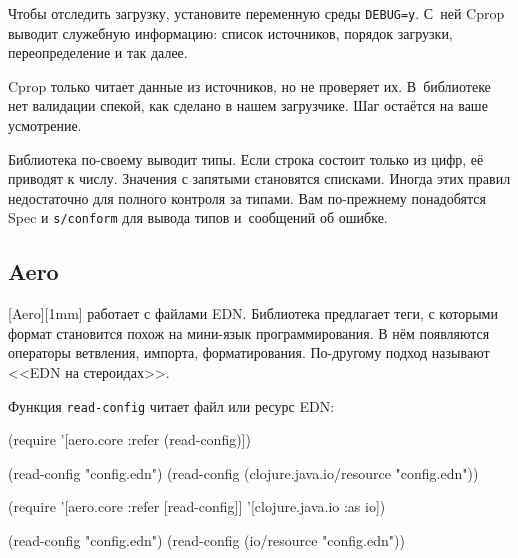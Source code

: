 Чтобы отследить загрузку, установите переменную среды \verb|DEBUG=y|. С~ней
Cprop выводит служебную информацию: список источников, порядок загрузки,
переопределение и так далее.

Cprop только читает данные из источников, но не проверяет их. В~библиотеке нет
валидации спекой, как сделано в нашем загрузчике. Шаг остаётся на ваше
усмотрение.

Библиотека по-своему выводит типы. Если строка состоит только из цифр, её
приводят к числу. Значения с запятыми становятся списками. Иногда этих правил
недостаточно для полного контроля за типами. Вам по-прежнему понадобятся
Spec и \verb|s/conform| для вывода типов и~сообщений об ошибке.

\subsection{Aero}


[Aero][1mm] работает с файлами
EDN. Библиотека предлагает теги, с которыми формат становится похож на мини-язык
программирования. В нём появляются операторы ветвления, импорта,
форматирования. По-другому подход называют <<EDN на стероидах>>.


Функция \verb|read-config| читает файл или ресурс EDN:

\ifnarrow

\begin{english}
  \begin{clojure}
(require
  '[aero.core :refer (read-config)])

(read-config "config.edn")
(read-config
  (clojure.java.io/resource
    "config.edn"))
  \end{clojure}
\end{english}

\else

\begin{english}
  \begin{clojure}
(require '[aero.core :refer [read-config]]
         '[clojure.java.io :as io])

(read-config "config.edn")
(read-config (io/resource "config.edn"))
  \end{clojure}
\end{english}

\fi


